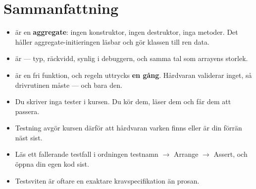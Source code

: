 \section*{Sammanfattning}

\begin{itemize}
  \item {} är en \textbf{aggregate}: ingen konstruktor, ingen destruktor, inga metoder.
    Det håller aggregate-initieringen läsbar och gör klassen till ren data.
  \item {} är  --- typ, räckvidd, synlig i debuggern, och
    samma tal som arrayens storlek.
  \item {} är en fri funktion, och regeln uttrycks \textbf{en gång}. Hårdvaran
    validerar inget, så drivrutinen måste --- och bara den.
  \item Du skriver inga tester i kursen. Du kör dem, läser dem och får dem att passera.
  \item Testning avgör kursen därför att hårdvaran varken finns eller är din förrän näst sist.
  \item Läs ett fallerande testfall i ordningen testnamn $\rightarrow$ Arrange $\rightarrow$
    Assert, och öppna din egen kod sist.
  \item Testsviten är oftare en exaktare kravspecifikation än prosan.
\end{itemize}

